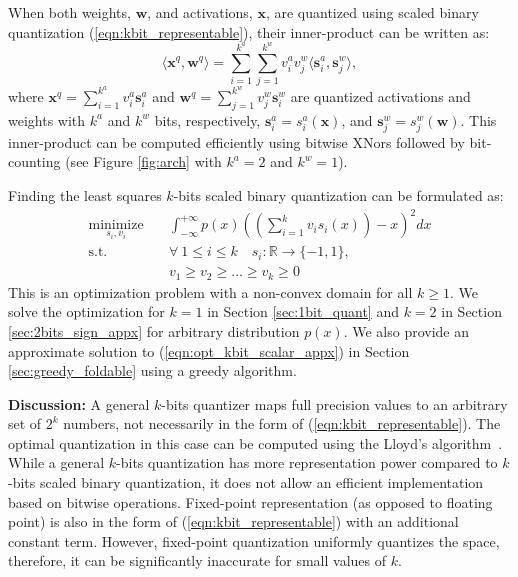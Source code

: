 \documentclass[10pt,twocolumn,letterpaper]{article}
\def\vw{{\bm{w}}}
\def\vx{{\bm{x}}}
\def\vs{{\bm{s}}}
\newcommand{\R}{\mathbb{R}}
\begin{document}
When both weights, $\vw$, and activations, $\vx$, are quantized using scaled binary quantization (\ref{eqn:kbit_representable}),
their inner-product can be written as:
\begin{equation} \label{eqn:xnor_dot}
	\langle \vx^q,  \vw^q \rangle = \sum_{i=1}^{k^a} \sum_{j=1}^{k^w} v_i^a v_j^w \langle \vs_i^a, \vs_j^w \rangle,
\end{equation}
where $ \vx^q = \sum_{i=1}^{k^a} v_i^a \vs_i^a $ and $\vw^q = \sum_{j=1}^{k^w} v_j^w \vs_i^w$ are quantized activations and weights  with $k^a$ and $k^w$ bits, respectively, 
$\vs_i^a = s_i^a(\vx)$, and $\vs_j^w = s_j^w(\vw)$. This inner-product can be computed efficiently using bitwise XNors followed by bit-counting (see Figure \ref{fig:arch} with $k^a = 2$ and $k^w=1$).

Finding the least squares $k$-bits scaled binary quantization can be formulated as:
\begin{equation}\label{eqn:opt_kbit_scalar_appx}
\begin{aligned}
\underset{s_i, v_i}{\text{minimize}} \quad & \int_{-\infty}^{+\infty} p(x)\left(\left(\sum_{i=1}^k v_i s_i(x) \right) - x\right)^2 dx\\
\text{s.t.} \quad & \forall~1\le i \le k \quad s_i: \R \to \{-1,1\},\\ &v_1 \ge v_2 \ge \ldots \ge v_k \ge 0
\end{aligned}
\end{equation}
This is an optimization problem with a non-convex domain for all $k \ge 1$. We solve the optimization for $k=1$ in Section \ref{sec:1bit_quant} and $k=2$ in Section \ref{sec:2bits_sign_appx} for arbitrary distribution $p(x)$. We also provide an approximate solution to (\ref{eqn:opt_kbit_scalar_appx}) in Section \ref{sec:greedy_foldable} using a greedy algorithm.

{\bf Discussion:} A general $k$-bits quantizer maps full precision values to an arbitrary set of $2^k$ numbers, not necessarily in the form of (\ref{eqn:kbit_representable}). The optimal quantization in this case can be computed using the Lloyd's algorithm~\cite{lloyd1982least}. While a general $k$-bits quantization has more representation power compared to $k$-bits scaled binary quantization, it does not allow an efficient implementation based on bitwise operations. Fixed-point representation (as opposed to floating point) is also in the form of (\ref{eqn:kbit_representable}) with an additional constant term. 
However, fixed-point quantization uniformly quantizes the space, therefore, it can be significantly inaccurate for small values of $k$.
\end{document}
